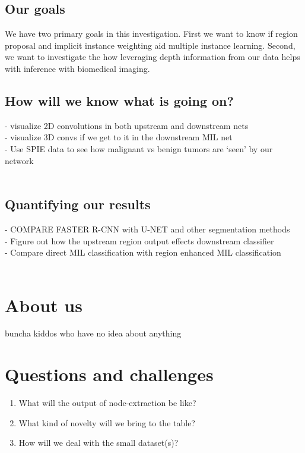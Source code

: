 \documentclass[twocolumn,10pt]{article}
\newcommand{\red}[1]{{\color{red}#1}}
\newcommand{\temp}[1]{{\red{#1}\\}}
\begin{document}
\subsection{Our goals}
We have two primary goals in this investigation. First we want to know if region
proposal and implicit instance weighting aid multiple instance learning. Second,
we want to investigate the how leveraging depth information from our data helps
with inference with biomedical imaging.

\subsection{How will we know what is going on?}
\temp{
  - visualize 2D convolutions in both upstream and downstream nets \\
  - visualize 3D convs if we get to it in the downstream MIL net \\
  - Use SPIE data to see how malignant vs benign tumors are `seen' by our network\\
}


\subsection{Quantifying our results}
\temp{
  - COMPARE FASTER R-CNN with U-NET and other segmentation methods\\
  - Figure out how the upstream region output effects downstream classifier\\
  - Compare direct MIL classification with region enhanced MIL classification\\
}

\section{About us}
\temp{buncha kiddos who have no idea about anything}



\section{Questions and challenges}
\begin{enumerate}
	\item What will the output of node-extraction be like?
	\item What kind of novelty will we bring to the table?
	\item How will we deal with the small dataset(s)?
\end{enumerate}


\end{document}
